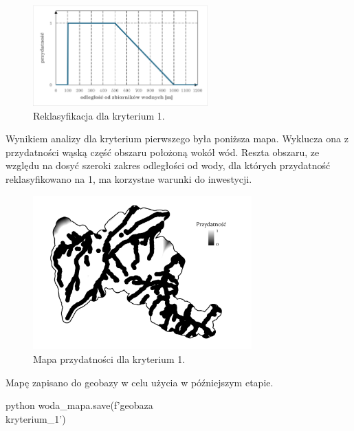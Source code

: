 \documentclass{article}
\begin{document}
\begin{figure}[H]
    \centering
    \includegraphics[width=0.6\textwidth]{img/kryterium1-wykres-glowny.png}
    \caption{Reklasyfikacja dla kryterium 1.}
\end{figure}
\newpage

Wynikiem analizy dla kryterium pierwszego była poniższa mapa. Wyklucza ona z przydatności wąską część obszaru położoną wokół wód. Reszta obszaru, ze względu na dosyć szeroki zakres odległości od wody, dla których przydatność reklasyfikowano na 1, ma korzystne warunki do inwestycji.
\vspace{5pt}

\begin{figure}[H]
    \centering
    \includegraphics[width=0.75\textwidth]{img/kryterium1-layout.jpg}
    \caption{Mapa przydatności dla kryterium 1.}
\end{figure}
\vspace{10pt}

Mapę zapisano do geobazy w celu użycia w późniejszym etapie.
\vspace{5pt}

\begin{mintedbox}{python}
woda_mapa.save(f'{geobaza}\\kryterium_1')
\end{mintedbox}
\vspace{10pt}
\end{document}
